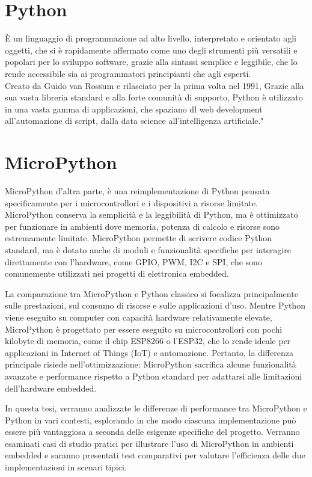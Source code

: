 \documentclass[12pt,a4paper]{report}
\begin{document}
\section{Python}

È un linguaggio di programmazione ad alto livello, interpretato e
orientato agli oggetti, che si è rapidamente affermato come uno degli
strumenti più versatili e popolari per lo sviluppo software, grazie alla
sintassi semplice e leggibile, che lo rende accessibile sia ai
programmatori principianti che agli esperti.\\
Creato da Guido van Rossum e rilasciato per la prima volta nel 1991,
Grazie alla sua vasta libreria standard e alla forte comunità di
supporto, Python è utilizzato in una vasta gamma di applicazioni, che
spaziano dl web development all'automazione di script, dalla data science all'intelligenza artificiale."

\section{MicroPython}

MicroPython d'altra parte, è una reimplementazione di
Python pensata specificamente per i microcontrollori e i dispositivi a
risorse limitate. MicroPython conserva la semplicità e la leggibilità di
Python, ma è ottimizzato per funzionare in ambienti dove memoria,
potenza di calcolo e risorse sono estremamente limitate. MicroPython
permette di scrivere codice Python standard, ma è dotato anche di moduli
e funzionalità specifiche per interagire direttamente con
l'hardware, come GPIO, PWM, I2C e SPI, che sono
comunemente utilizzati nei progetti di elettronica embedded.

La comparazione tra MicroPython e Python classico si focalizza
principalmente sulle prestazioni, sul consumo di risorse e sulle
applicazioni d'uso. Mentre Python viene eseguito su
computer con capacità hardware relativamente elevate, MicroPython è
progettato per essere eseguito su microcontrollori con pochi kilobyte di
memoria, come il chip ESP8266 o l'ESP32, che lo rende
ideale per applicazioni in Internet of Things (IoT) e automazione.
Pertanto, la differenza principale risiede
nell'ottimizzazione: MicroPython sacrifica alcune
funzionalità avanzate e performance rispetto a Python standard per
adattarsi alle limitazioni dell'hardware embedded.

In questa tesi, verranno analizzate le differenze di performance tra
MicroPython e Python in vari contesti, esplorando in che modo ciascuna
implementazione può essere più vantaggiosa a seconda delle esigenze
specifiche del progetto. Verranno esaminati casi di studio pratici per
illustrare l'uso di MicroPython in ambienti embedded e
saranno presentati test comparativi per valutare
l'efficienza delle due implementazioni in scenari
tipici.
\end{document}
